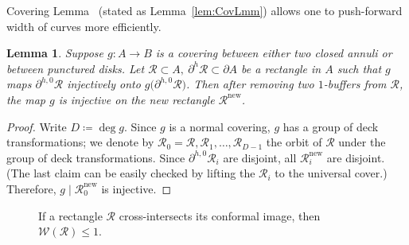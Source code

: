 \documentclass{amsart}
\newcommand{\1}{{\mathbb 1 }}
\newcommand{\Width}{{\mathcal W}}
\newcommand\RR{\mathcal{R}}
\newcommand\new{{\operatorname{new}}}
\newtheorem{lem}[thm]{Lemma}
\theoremstyle{remark}
\numberwithin{equation}{section}
\theoremstyle{definition}
\begin{document}
 

Covering Lemma~\cite{KL} (stated as Lemma~\ref{lem:CovLmm}) allows one to push-forward width of curves more efficiently.


\begin{lem}
\label{lem:univ push} Suppose $g\colon A\to B$ is a covering between either two closed annuli or between punctured disks. Let $\RR\subset A, \ \partial^h\RR\subset \partial A $ be a rectangle in $A$ such that $g$ maps $\partial^{h,0} \RR$ injectively onto $g\big(\partial^{h,0} \RR \big)$. Then after removing two $1$-buffers from $\RR$, the map $g$ is injective on the new rectangle $\RR^\new$.
\end{lem}
\begin{proof}
Write $D\coloneqq \deg g$. Since $g$ is a normal covering, $g$ has a group of deck transformations; we denote by $\RR_0=\RR, \RR_1,\dots, \RR_{D-1}$ the orbit of $\RR$ under the group of deck transformations. Since $\partial^{h,0} \RR_i$ are disjoint, all $\RR_i^\new$ are disjoint. (The last claim can be easily checked by lifting the $\RR_i$ to the universal cover.) Therefore, $g\mid \RR^\new_0$ is injective.
\end{proof}







\begin{figure}


\caption{If a rectangle $\RR$ cross-intersects its conformal image, then $\Width(\RR)\le 1$.}
\label{fig:cross inters}
\end{figure}
\end{document}
